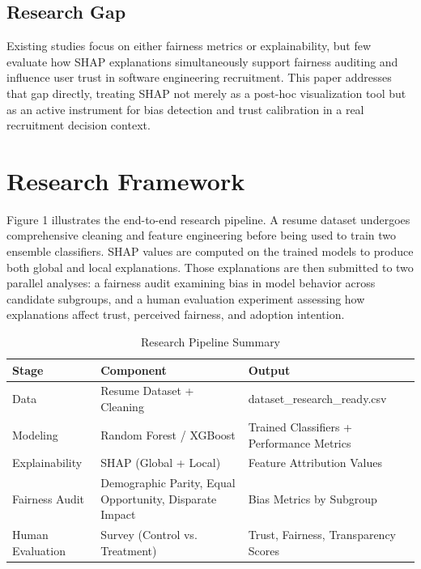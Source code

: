 \documentclass[conference]{IEEEtran}
\begin{document}
\subsection{Research Gap}

Existing studies focus on either fairness metrics or explainability, but few evaluate how SHAP explanations simultaneously support fairness auditing and influence user trust in software engineering recruitment. This paper addresses that gap directly, treating SHAP not merely as a post-hoc visualization tool but as an active instrument for bias detection and trust calibration in a real recruitment decision context.

\section{Research Framework}

Figure 1 illustrates the end-to-end research pipeline. A resume dataset undergoes comprehensive cleaning and feature engineering before being used to train two ensemble classifiers. SHAP values are computed on the trained models to produce both global and local explanations. Those explanations are then submitted to two parallel analyses: a fairness audit examining bias in model behavior across candidate subgroups, and a human evaluation experiment assessing how explanations affect trust, perceived fairness, and adoption intention.

\begin{table}[htbp]
\caption{Research Pipeline Summary}
\begin{center}
\begin{tabular}{|p{1.1cm}|p{2.7cm}|p{3.3cm}|}
\hline
\textbf{Stage} & \textbf{Component} & \textbf{Output} \\
\hline
Data & Resume Dataset + Cleaning & dataset\_research\_ready.csv \\
\hline
Modeling & Random Forest / XGBoost & Trained Classifiers + Performance Metrics \\
\hline
Explainability & SHAP (Global + Local) & Feature Attribution Values \\
\hline
Fairness Audit & Demographic Parity, Equal Opportunity, Disparate Impact & Bias Metrics by Subgroup \\
\hline
Human Evaluation & Survey (Control vs. Treatment) & Trust, Fairness, Transparency Scores \\
\hline
\end{tabular}
\label{tab:pipeline}
\end{center}
\end{table}
\end{document}
